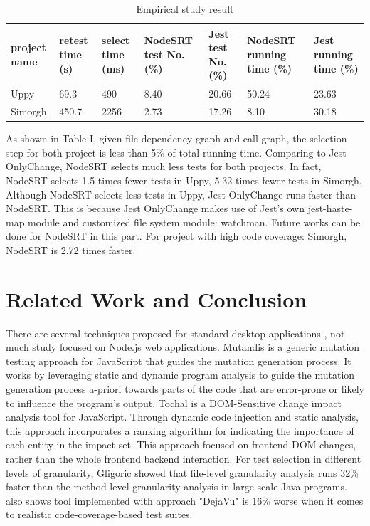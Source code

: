 \documentclass[10pt, conference]{IEEEtran}
\begin{document}
\begin{table}[htbp]
    \caption{Empirical study result}
    \centering
    \begin{tabular}{@{}|p{3em}|p{2em}|p{1.8em}|p{3.5em}|p{2em}|p{3.5em}|p{2.5em}|@{}}
    \toprule
    project name & retest time (s)&select time (ms)&NodeSRT test No. (\%)&Jest test No. (\%)& NodeSRT running time (\%) & Jest running time (\%) \\ \midrule
    Uppy         & 69.3  &  490   &                    8.40              &  20.66              &   50.24               &   23.63                    \\ \midrule
    Simorgh      & 450.7  &  2256 &                    2.73              &  17.26              &   8.10                &   30.18                   \\ \bottomrule
    \end{tabular}
    \end{table}



As shown in Table I, given file dependency graph and call graph, the selection step for both project is less than 5\% of total 
running time. Comparing to Jest OnlyChange, NodeSRT selects much less tests for both projects. In fact, NodeSRT selects 1.5 times fewer 
tests in Uppy, 5.32 times fewer tests in Simorgh. Although NodeSRT selects less tests in Uppy, Jest OnlyChange runs faster than NodeSRT. 
This is because Jest OnlyChange makes use of Jest's own jest-haste-map module and customized file system module: watchman. Future works can 
be done for NodeSRT in this part. For project with high code coverage: Simorgh, NodeSRT is 2.72 times faster. 


\section{Related Work and Conclusion}
There are several techniques proposed for standard desktop applications \cite{b2, b3, b4, b5, b7, b9, b12, b13, b14, b17},
not much study focused on Node.js web applications. Mutandis \cite{b11} is a generic mutation testing 
approach for JavaScript that guides the mutation generation process. It works by leveraging static and dynamic program 
analysis to guide the mutation generation process a-priori towards parts of the code that are error-prone or 
likely to influence the program’s output. 
Tochal \cite{b1} is a DOM-Sensitive change impact analysis tool for JavaScript. Through dynamic code injection and static analysis, this 
approach incorporates a ranking algorithm for indicating the importance of each entity in the impact set. This 
approach focused on frontend DOM changes, rather than the whole frontend backend interaction. For test selection in different levels 
of granularity, Gligoric \cite{b6} showed that file-level granularity 
analysis runs 32\% faster than the method-level granularity analysis in large scale Java programs.\cite{b15} also shows 
tool implemented with approach "DejaVu" \cite{b14} is 16\% worse when it comes to realistic code-coverage-based test suites.
\end{document}

